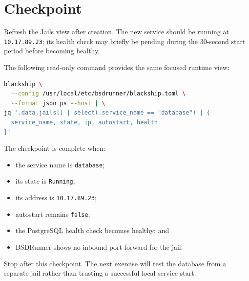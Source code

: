 \section{Checkpoint}

Refresh the Jails view after creation. The new service should be running at
\texttt{10.17.89.23}; its health check may briefly be pending during the
30-second start period before becoming healthy.

The following read-only command provides the same focused runtime view:

\begin{lstlisting}[language=sh]
blackship \
  --config /usr/local/etc/bsdrunner/blackship.toml \
  --format json ps --host | \
jq '.data.jails[] | select(.service_name == "database") | {
  service_name, state, ip, autostart, health
}'
\end{lstlisting}

The checkpoint is complete when:

\begin{itemize}
  \item the service name is \texttt{database};
  \item its state is \texttt{Running};
  \item its address is \texttt{10.17.89.23};
  \item autostart remains \texttt{false};
  \item the PostgreSQL health check becomes healthy; and
  \item BSDRunner shows no inbound port forward for the jail.
\end{itemize}

Stop after this checkpoint. The next exercise will test the database from a
separate jail rather than trusting a successful local service start.
